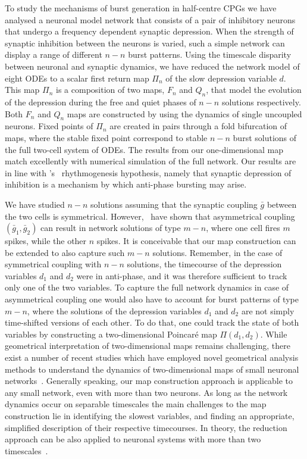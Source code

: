 \documentclass[utf8]{frontiersFPHY} %
\newcommand{\gbar}{\bar g}
\begin{document}
To study the mechanisms of burst generation in half-centre CPGs we have analysed a neuronal model network that consists of a pair of inhibitory neurons that undergo a frequency dependent synaptic depression.
When the strength of synaptic inhibition between the neurons is varied, such a simple network can display a range of different $n-n$ burst patterns.
Using the timescale disparity between neuronal and synaptic dynamics, we have reduced the network model of eight ODEs to a scalar first return map $\Pi_n$ of the slow depression variable $d$.
This map $\Pi_n$ is a composition of two maps, $F_n$ and $Q_n$, that model the evolution of the depression during the free and quiet phases of $n-n$ solutions respectively.
Both $F_n$ and $Q_n$ maps are constructed by using the dynamics of single uncoupled neurons.
Fixed points of $\Pi_n$ are created in pairs through a fold bifurcation of maps, where the stable fixed point correspond to stable $n-n$ burst solutions of the full two-cell system of ODEs.
The results from our one-dimensional map match excellently with numerical simulation of the full network.
Our results are in line with \citeauthor{brown1911}'s~\citeyear{brown1911} rhythmogenesis hypothesis, namely that synaptic depression of inhibition is a mechanism by which anti-phase bursting may arise.

We have studied $n-n$ solutions assuming that the synaptic coupling $\gbar $ between the two cells is symmetrical.
However,~\citet{bose2011} have shown that asymmetrical coupling $(\gbar_1, \gbar_2)$ can result in network solutions of type $m-n$, where one cell fires $m$ spikes, while the other $n$ spikes.
It is conceivable that our map construction can be extended to also capture such $m-n$ solutions.
Remember, in the case of symmetrical coupling with $n-n$ solutions, the timecourse of the depression variables $d_{1}$ and $d_{2}$ were in anti-phase, and it was therefore sufficient to track only one of the two variables.
To capture the full network dynamics in case of asymmetrical coupling one would also have to account for burst patterns of type $m-n$, where the solutions of the depression variables $d_1$ and $d_2$ are not simply time-shifted versions of each other.
To do that, one could track the state of both variables by constructing a two-dimensional Poincaré map $\Pi(d_1,d_2)$.
While geometrical interpretation of two-dimensional maps remains challenging, there exist a number of recent studies which have employed novel geometrical analysis methods to understand the dynamics of two-dimensional maps of small neuronal networks~\citep{akcay2014,akcay2018,liao2020}.
Generally speaking, our map construction approach is applicable to any small network, even with more than two neurons.
As long as the network dynamics occur on separable timescales the main challenges to the map construction lie in identifying the slowest variables, and finding an appropriate, simplified description of their respective timecourses. 
In theory, the reduction approach can be also applied to neuronal systems with more than two timescales~\citep[e.g. see][]{kuehn2015}.
\end{document}
